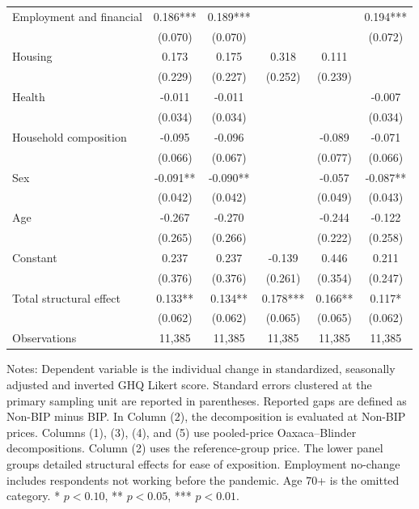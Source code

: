 \begin{table}
\begin{threeparttable}
\begin{tabular*}{\textwidth}{@{\extracolsep{\fill}}p{5.0cm}ccccc}
\hspace{0.1cm}Employment and financial & 0.186*** & 0.189*** &  &  & 0.194*** \\
 & (0.070) & (0.070) &  &  & (0.072) \\
\hspace{0.1cm}Housing & 0.173 & 0.175 & 0.318 & 0.111 &  \\
 & (0.229) & (0.227) & (0.252) & (0.239) &  \\
\hspace{0.1cm}Health & -0.011 & -0.011 &  &  & -0.007 \\
 & (0.034) & (0.034) &  &  & (0.034) \\
\hspace{0.1cm}Household composition & -0.095 & -0.096 &  & -0.089 & -0.071 \\
 & (0.066) & (0.067) &  & (0.077) & (0.066) \\
\hspace{0.1cm}Sex & -0.091** & -0.090** &  & -0.057 & -0.087** \\
 & (0.042) & (0.042) &  & (0.049) & (0.043) \\
\hspace{0.1cm}Age & -0.267 & -0.270 &  & -0.244 & -0.122 \\
 & (0.265) & (0.266) &  & (0.222) & (0.258) \\
\hspace{0.1cm}Constant & 0.237 & 0.237 & -0.139 & 0.446 & 0.211 \\
 & (0.376) & (0.376) & (0.261) & (0.354) & (0.247) \\
Total structural effect & 0.133** & 0.134** & 0.178*** & 0.166** & 0.117* \\
 & (0.062) & (0.062) & (0.065) & (0.065) & (0.062) \\
\addlinespace[0.3em]
Observations & 11,385 & 11,385 & 11,385 & 11,385 & 11,385 \\
\bottomrule
\end{tabular*}
\begin{tablenotes}[flushleft]
\scriptsize
\item Notes: Dependent variable is the individual change in standardized, seasonally adjusted and inverted GHQ Likert score. Standard errors clustered at the primary sampling unit are reported in parentheses. Reported gaps are defined as Non-BIP minus BIP. In Column (2), the decomposition is evaluated at Non-BIP prices. Columns (1), (3), (4), and (5) use pooled-price Oaxaca--Blinder decompositions. Column (2) uses the reference-group price. The lower panel groups detailed structural effects for ease of exposition. Employment no-change includes respondents not working before the pandemic. Age 70+ is the omitted category. * \(p<0.10\), ** \(p<0.05\), *** \(p<0.01\).
\end{tablenotes}
\end{threeparttable}
\end{table}